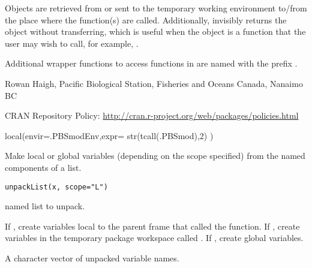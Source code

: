 \documentclass[letterpaper]{book}
\begin{document}
%
\begin{Value}
Objects are retrieved from or sent to the temporary working 
environment to/from the place where the function(s) are called.
Additionally,  invisibly returns the object without 
transferring, which is useful when the object is a function that the
user may wish to call, for example, .
\end{Value}
%
\begin{Note}\relax
Additional wrapper functions to access functions in 
are named with the prefix .
\end{Note}
%
\begin{Author}\relax
Rowan Haigh, Pacific Biological Station, Fisheries and Oceans Canada, Nanaimo BC
\end{Author}
%
\begin{References}\relax
CRAN Repository Policy: 
\url{http://cran.r-project.org/web/packages/policies.html}
\end{References}
%
\begin{Examples}
\begin{ExampleCode}
local(envir=.PBSmodEnv,expr={
  str(tcall(.PBSmod),2)
})
\end{ExampleCode}
\end{Examples}
%
\begin{Description}\relax
Make local or global variables (depending on the scope specified) from 
the named components of a list.
\end{Description}
%
\begin{Usage}
\begin{verbatim}
unpackList(x, scope="L")
\end{verbatim}
\end{Usage}
%
\begin{Arguments}
\begin{ldescription}
\item[\code{x}] named list to unpack.
\item[\code{scope}] If , create variables local to the parent
frame that called the function. If , create variables
in the temporary package workspace called . 
If , create global variables.
\end{ldescription}
\end{Arguments}
%
\begin{Value}
A character vector of unpacked variable names.
\end{Value}
\end{document}
